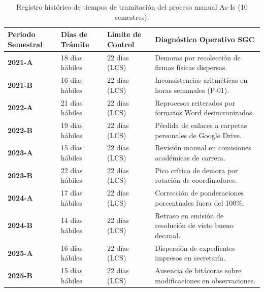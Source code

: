 \documentclass[12pt,a4paper]{article}
\begin{document}
\begin{table}[H]
\centering
\small
\renewcommand{\arraystretch}{1.15}
\begin{tabularx}{\textwidth}{|>{\hsize=0.7\hsize\centering\arraybackslash\bfseries\footnotesize}X|>{\hsize=0.8\hsize\centering\arraybackslash\footnotesize}X|>{\hsize=0.9\hsize\centering\arraybackslash\footnotesize}X|>{\hsize=1.6\hsize\raggedright\arraybackslash\footnotesize}X|}
\hline
\rowcolor{tableheader}
\textbf{Periodo Semestral} & \textbf{Días de Trámite} & \textbf{Límite de Control} & \textbf{Diagnóstico Operativo SGC} \\
\hline
2021-A & 18 días hábiles & 22 días (LCS) & Demoras por recolección de firmas físicas dispersas. \\
\hline
2021-B & 16 días hábiles & 22 días (LCS) & Inconsistencias aritméticas en horas semanales (P-01). \\
\hline
2022-A & 21 días hábiles & 22 días (LCS) & Reprocesos reiterados por formatos Word desincronizados. \\
\hline
2022-B & 19 días hábiles & 22 días (LCS) & Pérdida de enlaces a carpetas personales de Google Drive. \\
\hline
2023-A & 15 días hábiles & 22 días (LCS) & Revisión manual en comisiones académicas de carrera. \\
\hline
2023-B & 22 días hábiles & 22 días (LCS) & Pico crítico de demora por rotación de coordinadores. \\
\hline
2024-A & 17 días hábiles & 22 días (LCS) & Corrección de ponderaciones porcentuales fuera del 100\%. \\
\hline
2024-B & 14 días hábiles & 22 días (LCS) & Retraso en emisión de resolución de visto bueno decanal. \\
\hline
2025-A & 16 días hábiles & 22 días (LCS) & Dispersión de expedientes impresos en secretaría. \\
\hline
2025-B & 15 días hábiles & 22 días (LCS) & Ausencia de bitácoras sobre modificaciones en observaciones. \\
\hline
\end{tabularx}
\caption{Registro histórico de tiempos de tramitación del proceso manual As-Is (10 semestres).}
\label{tab:historico_runchart}
\end{table}
\end{document}
